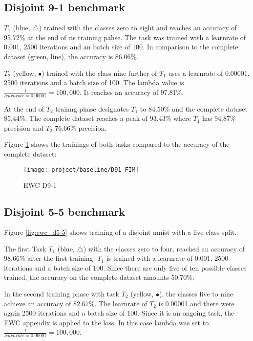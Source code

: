 \subsection{Disjoint 9-1 benchmark}

$T_1$ (blue, $\bigtriangleup$) trained with the classes zero to eight and reaches an accuracy of 95.72\% at the end of its training pahse.
The task was trained with a learnrate of 0.001, 2500 iterations and an batch size of 100.
In comparison to the complete dataset (green, line), the accuracy is 86.06\%.

$T_2$ (yellow, $\bullet$) trained with the class nine further of $T_1$ uses a learnrate of 0.00001, 2500 iterations and a batch size of 100.
The lambda value is $\frac{1}{learnrate = 0.00001} = 100,000$.
It reaches an accuracy of 97.81\%.

At the end of $T_2$ trainng phase designates $T_1$ to 84.50\% and the complete dataset 85.44\%.
The complete dataset reaches a peak of 93.43\% where $T_1$ has 94.87\% precision and $T_2$ 76.66\% precision.

Figure \ref{fig:ewc_d9-1} shows the trainings of both tasks compared to the accuracy of the complete dataset:

\begin{figure}[H]
    \centering
    \texttt{[image: project/baseline/D91\_FIM]}
    \caption{EWC D9-1}
    \label{fig:ewc_d9-1}
\end{figure}

\subsection{Disjoint 5-5 benchmark}

Figure \ref{fig:ewc_d5-5} shows training of a disjoint mnist with a five class split.

The first Task $T_1$ (blue, $\bigtriangleup$) with the classes zero to four, reached an accuracy of 98.66\% after the first training.
$T_1$ is trained with a learnrate of 0.001, 2500 iterations and a batch size of 100.
Since there are only five of ten possible classes trained, the accuracy on the complete dataset amounts 50.70\%.

In the second training phase with task $T_2$ (yellow, $\bullet$), the classes five to nine achieve an accuracy of 82.67\%.
The learnrate of $T_2$ is 0.00001 and there were again 2500 iterations and a batch size of 100.
Since it is an ongoing task, the EWC appendix is applied to the loss.
In this case lambda was set to $\frac{1}{learnrate = 0.00001} = 100,000$.

